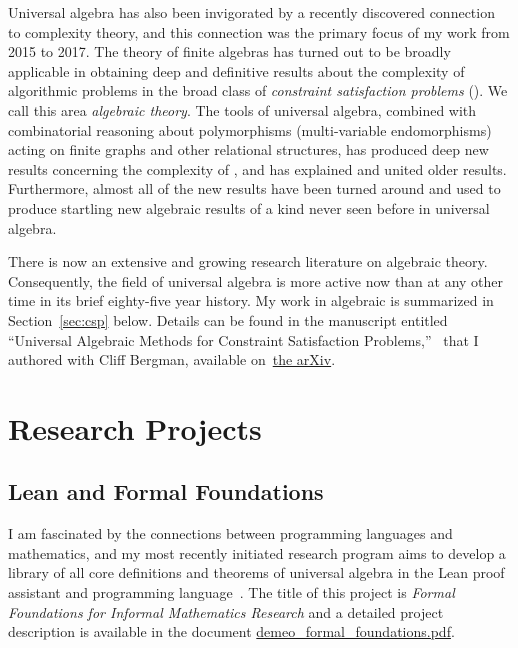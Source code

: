 Universal algebra has also been invigorated by a recently discovered connection to complexity theory, and this connection was the primary focus of my work from 2015 to 2017. 
The theory of finite algebras has turned out to be broadly applicable in obtaining deep and definitive results about the complexity of algorithmic problems in the broad class of  {\it constraint satisfaction problems} (\csps).   We call this area {\it algebraic \csp theory}.
The tools of universal algebra, combined with combinatorial reasoning about polymorphisms (multi-variable endomorphisms) acting on finite graphs and other relational structures, has produced deep new results concerning the complexity of \csps, and has explained and united older results. Furthermore, almost all of the new results have been turned around and used to produce
startling new algebraic results of a kind never seen before in universal algebra.

There is now an extensive and growing research literature on algebraic \csp theory. Consequently, the field of universal algebra is more active now than at any other time in its brief eighty-five year history. My work in algebraic \csp is summarized in Section~\ref{sec:csp} below. Details can be found in the manuscript entitled ``Universal Algebraic Methods for Constraint Satisfaction Problems,''~\cite{Bergman-DeMeo:2016} that I authored with Cliff Bergman, available on~\href{https://arxiv.org/abs/1611.02867}{the arXiv}.

\newpage

\null

\vskip5mm

\section{Research Projects}

\subsection{Lean and Formal Foundations}
\label{sec:formal}
I am fascinated by the connections between programming languages and mathematics, and my most recently initiated research program aims to develop a library of all core definitions and theorems of universal algebra in the Lean proof assistant and programming language~\cite{lean}.
The title of this project is \emph{Formal Foundations for Informal Mathematics Research} and a detailed project description is available in the document 
\href{https://github.com/williamdemeo/job-app/blob/master/research/demeo_formal_foundations.pdf}{demeo\_formal\_foundations.pdf}.

